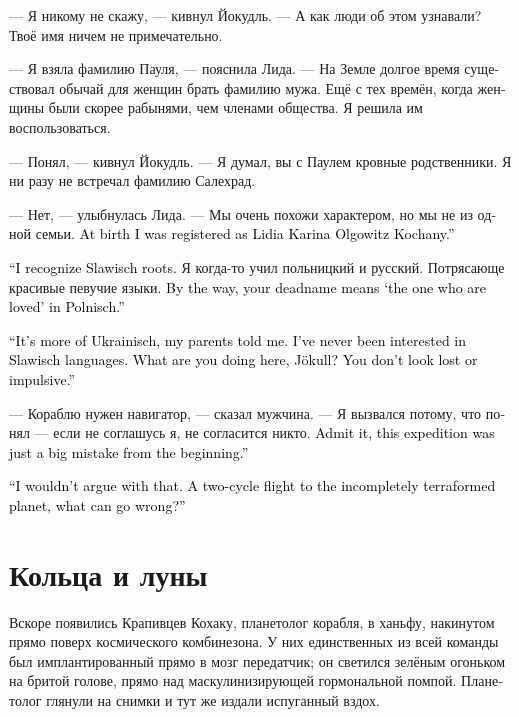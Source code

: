 \documentclass[a4paper,12pt,fleqn]{book}\usepackage{cooltooltips}\usepackage{polyglossia}\setdefaultlanguage[babelshorthands=true]{russian}\setotherlanguage{english}\defaultfontfeatures{Ligatures=TeX,Mapping=tex-text} \usepackage{xcolor}\definecolor{lightgray}{HTML}{bbbbbb}\color{lightgray}\newcommand{\ml}[3]{\textenglish{\textcolor{black}{#3}}}
\begin{document}
--- Я никому не скажу, --- кивнул Йокудль.
--- А как люди об этом узнавали?
Твоё имя ничем не примечательно.

--- Я взяла фамилию Пауля, --- пояснила Лида.
--- На Земле долгое время существовал обычай для женщин брать фамилию мужа.
Ещё с тех времён, когда женщины были скорее рабынями, чем членами общества.
Я решила им воспользоваться.

--- Понял, --- кивнул Йокудль.
--- Я думал, вы с Паулем кровные родственники.
Я ни разу не встречал фамилию Салехрад. %

--- Нет, --- улыбнулась Лида.
--- Мы очень похожи характером, но мы не из одной семьи.
\ml{$0$}
{При рождении я была записана как Лидия Карина Ольговиц Коханый.}
{At birth I was registered as Lidia Karina Olgowitz Kochany.''}

\ml{$0$}
{--- Чую славицкие корни.}
{``I recognize Slawisch roots.}
Я когда-то учил польницкий и русский.
Потрясающе красивые певучие языки.
\ml{$0$}
{Кстати, твоя старая фамилия на польницком означает <<тот, кого любят>>.}
{By the way, your deadname means `the one who are loved' in Polnisch.''}

\ml{$0$}
{--- Она скорее украйницкая, как мне говорили родители.}
{``It's more of Ukrainisch, my parents told me.}
\ml{$0$}
{Никогда не интересовалась славицкими языками.}
{I've never been interested in Slawisch languages.}
\ml{$0$}
{А что ты здесь делаешь, Йокудль?}
{What are you doing here, Jökull?}
\ml{$0$}
{Ты не выглядишь потерянным или импульсивным.}
{You don't look lost or impulsive.''}

--- Кораблю нужен навигатор, --- сказал мужчина.
--- Я вызвался потому, что понял --- если не соглашусь я, не согласится никто.
\ml{$0$}
{Признай --- эта экспедиция изначально была ошибкой.}
{Admit it, this expedition was just a big mistake from the beginning.''}

\ml{$0$}
{--- Даже не буду спорить.}
{``I wouldn't argue with that.}
\ml{$0$}
{Лететь с двумя циклами к недотерраформированной планете --- что может пойти не так?}
{A two-cycle flight to the incompletely terraformed planet, what can go wrong?''}

\section{Кольца и луны}

Вскоре появились Крапивцев Кохаку, планетолог корабля, в ханьфу, накинутом прямо поверх космического комбинезона.
У них единственных из всей команды был имплантированный прямо в мозг передатчик;
он светился зелёным огоньком на бритой голове, прямо над маскулинизирующей гормональной помпой. 
Планетолог глянули на снимки и тут же издали испуганный вздох.
\end{document}

